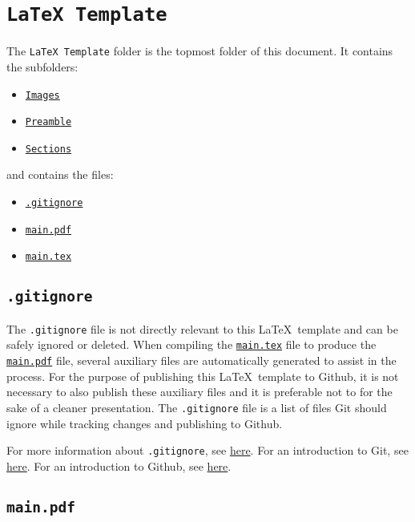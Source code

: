 \section{\texttt{LaTeX Template}}
\label{sec:latex_template}

The \texttt{LaTeX Template} folder is the topmost folder of this document. It contains the subfolders:
\begin{itemize}
    \item \hyperref[sec:images]{\texttt{Images}}
    \item \hyperref[sec:preamble]{\texttt{Preamble}}
    \item \hyperref[sec:sections]{\texttt{Sections}}
\end{itemize}
and contains the files:
\begin{itemize}
    \item \hyperref[sec:.gitignore]{\texttt{.gitignore}}
    \item \hyperref[sec:main.pdf]{\texttt{main.pdf}}
    \item \hyperref[sec:main.tex]{\texttt{main.tex}}
\end{itemize}

\subsection{\texttt{.gitignore}}
\label{sec:.gitignore}

The \texttt{.gitignore} file is not directly relevant to this \LaTeX\ template and can be safely ignored or deleted. When compiling the \hyperref[sec:main.tex]{\texttt{main.tex}} file to produce the \hyperref[sec:main.pdf]{\texttt{main.pdf}} file, several auxiliary files are automatically generated to assist in the process. For the purpose of publishing this \LaTeX\ template to Github, it is not necessary to also publish these auxiliary files and it is preferable not to for the sake of a cleaner presentation. The \texttt{.gitignore} file is a list of files Git should ignore while tracking changes and publishing to Github.

For more information about \texttt{.gitignore}, see \href{https://git-scm.com/docs/gitignore}{here}. For an introduction to Git, see \href{https://git-scm.com/book/en/v2}{here}. For an introduction to Github, see \href{https://skills.github.com/}{here}.

\subsection{\texttt{main.pdf}}
\label{sec:main.pdf}

